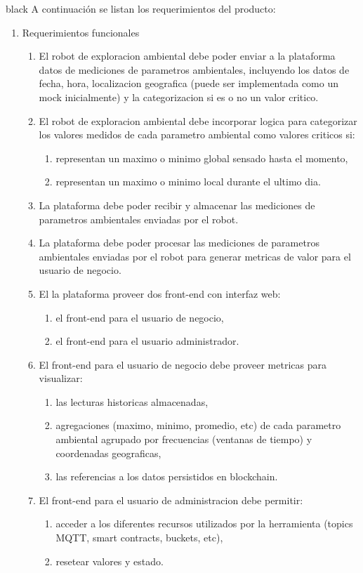 \documentclass[
11pt, %
]{charter}
\begin{document}
\begin{consigna}{black}
A continuación se listan los requerimientos del producto:

\begin{enumerate}	
	\item Requerimientos funcionales		
	\begin{enumerate}	
		
		\item El robot de exploracion ambiental debe poder enviar a la plataforma datos de mediciones de parametros ambientales, incluyendo los datos de fecha, hora, localizacion geografica (puede ser implementada como un mock inicialmente) y la categorizacion si es o no un valor critico.
		\item El robot de exploracion ambiental debe incorporar logica para categorizar los valores medidos de cada parametro ambiental como valores criticos si:
		\begin{enumerate}				
			\item representan un maximo o minimo global sensado hasta el momento,				
			\item representan un maximo o minimo local durante el ultimo dia.				
		\end{enumerate}			
		\item La plataforma debe poder recibir y almacenar las mediciones de parametros ambientales enviadas por el robot.
		\item La plataforma debe poder procesar las mediciones de parametros ambientales enviadas por el robot para generar metricas de valor para el usuario de negocio.		
		\item El la plataforma proveer dos front-end con interfaz web:
			\begin{enumerate}				
				\item el front-end para el usuario de negocio,				
				\item el front-end para el usuario administrador.				
			\end{enumerate}			
		
		\item El front-end para el usuario de negocio debe proveer metricas para visualizar:
			\begin{enumerate}				
				\item las lecturas historicas almacenadas,				
				\item agregaciones (maximo, minimo, promedio, etc) de cada parametro ambiental agrupado por frecuencias (ventanas de tiempo) y coordenadas geograficas,				
				\item las referencias a los datos persistidos en blockchain.
			\end{enumerate}			
		\item El front-end para el usuario de administracion debe permitir:
			\begin{enumerate}				
				\item acceder a los diferentes recursos utilizados por la herramienta (topics MQTT, smart contracts, buckets, etc),
				\item resetear valores y estado.			
			\end{enumerate}			
		\end{enumerate}	


\end{enumerate}
\end{consigna}
\end{document}
